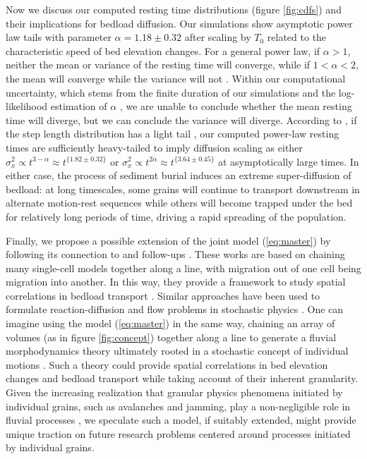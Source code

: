 \documentclass[draft]{agujournal2018}
\begin{document}
Now we discuss our computed resting time distributions (figure \ref{fig:cdfs}) and their implications for bedload diffusion.
Our simulations show asymptotic power law tails with parameter $\alpha = 1.18 \pm 0.32$ after scaling by $T_0$ related to the characteristic speed of bed elevation changes.
For a general power law, if $\alpha>1$, neither the mean or variance of the resting time will converge, while if $1<\alpha <2$, the mean will converge while the variance will not \citep[e.g.][]{Bradley2017}.
Within our computational uncertainty, which stems from the finite duration of our simulations and the log-likelihood estimation of $\alpha$ \citep[e.g.][]{Newman2005}, we are unable to conclude whether the mean resting time will diverge, but we can conclude the variance will diverge.
According to \citet{Weeks1998}, if the step length distribution has a light tail \citep[e.g.][]{Hassan2013}, our computed power-law resting times are sufficiently heavy-tailed to imply diffusion scaling as either $\sigma_x^2 \propto t^{3-\alpha} \approx t^{\{1.82 \pm 0.32 \}}$ or $\sigma_x^2 \propto t^{2\alpha} \approx t^{\{3.64\pm 0.45\}}$ at asymptotically large times.
In either case, the process of sediment burial induces an extreme super-diffusion of bedload: at long timescales, some grains will continue to transport downstream in alternate motion-rest sequences while others will become trapped under the bed for relatively long periods of time, driving a rapid spreading of the population.

Finally, we propose a possible extension of the joint model (\ref{eq:master}) by following its connection to \citet{Ancey2008} and follow-ups \citep[e.g.][]{Ancey2014a, Heyman2014, Heyman2015}.
These works are based on chaining many \citet{Ancey2008} single-cell models together along a line, with migration out of one cell being migration into another.
In this way, they provide a framework to study spatial correlations in bedload transport \citep[e.g.][]{Heyman2014,Heyman2015}.
Similar approaches have been used to formulate reaction-diffusion and flow problems in stochastic physics \citep[e.g.][]{Gardiner1983}. 
One can imagine using the model (\ref{eq:master}) in the same way, chaining an array of volumes (as in figure \ref{fig:concept}) together along a line to generate a fluvial morphodynamics theory ultimately rooted in a stochastic concept of individual motions \citep[e.g.][]{Einstein1937}.
Such a theory could provide spatial correlations in bed elevation changes and bedload transport while taking account of their inherent granularity.
Given the increasing realization that granular physics phenomena initiated by individual grains, such as avalanches and jamming, play a non-negligible role in fluvial processes \citep[e.g.][]{Saletti2016,Dhont2018}, we speculate such a model, if suitably extended, might provide unique traction on future research problems centered around processes initiated by individual grains.
\end{document}
